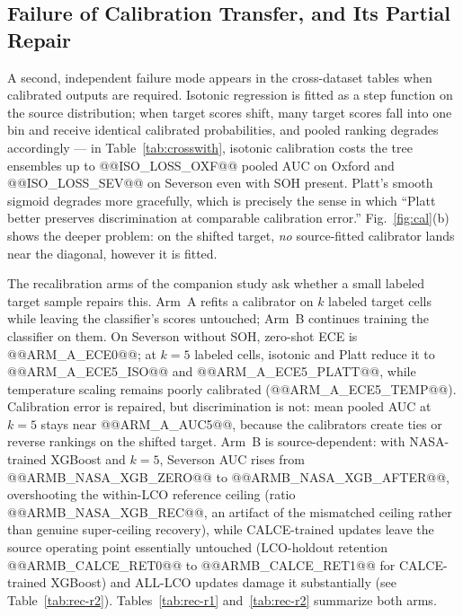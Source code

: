 \subsection{Failure of Calibration Transfer, and Its Partial Repair}
A second, independent failure mode appears in the cross-dataset tables when calibrated outputs are required. Isotonic regression is fitted as a step function on the source distribution; when target scores shift, many target scores fall into one bin and receive identical calibrated probabilities, and pooled ranking degrades accordingly --- in Table~\ref{tab:crosswith}, isotonic calibration costs the tree ensembles up to @@ISO_LOSS_OXF@@ pooled AUC on Oxford and @@ISO_LOSS_SEV@@ on Severson even with SOH present. Platt's smooth sigmoid degrades more gracefully, which is precisely the sense in which ``Platt better preserves discrimination at comparable calibration error.'' Fig.~\ref{fig:cal}(b) shows the deeper problem: on the shifted target, \emph{no} source-fitted calibrator lands near the diagonal, however it is fitted.

The recalibration arms of the companion study \cite{shikdar2026robustness} ask whether a small labeled target sample repairs this. Arm~A refits a calibrator on $k$ labeled target cells while leaving the classifier's scores untouched; Arm~B continues training the classifier on them. On Severson without SOH, zero-shot ECE is @@ARM_A_ECE0@@; at $k{=}5$ labeled cells, isotonic and Platt reduce it to @@ARM_A_ECE5_ISO@@ and @@ARM_A_ECE5_PLATT@@, while temperature scaling remains poorly calibrated (@@ARM_A_ECE5_TEMP@@). Calibration error is repaired, but discrimination is not: mean pooled AUC at $k{=}5$ stays near @@ARM_A_AUC5@@, because the calibrators create ties or reverse rankings on the shifted target. Arm~B is source-dependent: with NASA-trained XGBoost and $k{=}5$, Severson AUC rises from @@ARMB_NASA_XGB_ZERO@@ to @@ARMB_NASA_XGB_AFTER@@, overshooting the within-LCO reference ceiling (ratio @@ARMB_NASA_XGB_REC@@, an artifact of the mismatched ceiling rather than genuine super-ceiling recovery), while CALCE-trained updates leave the source operating point essentially untouched (LCO-holdout retention @@ARMB_CALCE_RET0@@ to @@ARMB_CALCE_RET1@@ for CALCE-trained XGBoost) and ALL-LCO updates damage it substantially (see Table~\ref{tab:rec-r2}). Tables~\ref{tab:rec-r1} and~\ref{tab:rec-r2} summarize both arms.

\begin{table}[!t]
\caption{Arm A Recalibration on Severson Without SOH ($H{=}20$): Values Average the Three LCO Sources and Available Tree Models; ECE Uses 10 Equal-Width Probability Bins. From the Released Recalibration Study Artifacts.}
\label{tab:rec-r1}
\centering
{}
\end{table}

